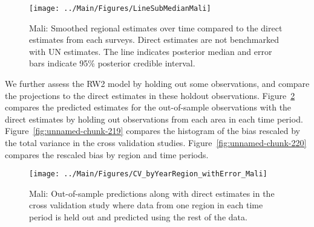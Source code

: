 \documentclass[12pt]{article}\usepackage[]{graphicx}\usepackage[]{color}
\newenvironment{knitrout}{}{} %
\begin{document}
\begin{knitrout}
\color{fgcolor}\begin{figure}[bht]

{\centering \texttt{[image: ../Main/Figures/LineSubMedianMali]} 

}

\caption[Mali]{Mali: Smoothed regional estimates over time compared to the direct estimates from each surveys. Direct estimates are not benchmarked with UN estimates. The line indicates posterior median and error bars indicate 95\% posterior credible interval.}\label{fig:unnamed-chunk-217}
\end{figure}


\end{knitrout}
We further assess the RW2 model by holding out some observations, and compare the projections to the direct estimates in these holdout observations. Figure~\ref{fig:unnamed-chunk-218} compares the predicted estimates for the out-of-sample observations  with the direct estimates by holding out observations from each area in each time period.  Figure~\ref{fig:unnamed-chunk-219} compares the histogram of the bias rescaled by the total variance in the cross validation studies. Figure~\ref{fig:unnamed-chunk-220} compares the rescaled bias by region and time periods.



 
\begin{knitrout}
\color{fgcolor}\begin{figure}[bht]

{\centering \texttt{[image: ../Main/Figures/CV\_byYearRegion\_withError\_Mali]} 

}

\caption[Mali]{Mali: Out-of-sample predictions along with direct estimates in the cross validation study where data from one region in each time period is held out and predicted using the rest of the data.}\label{fig:unnamed-chunk-218}
\end{figure}


\end{knitrout}
\end{document}

